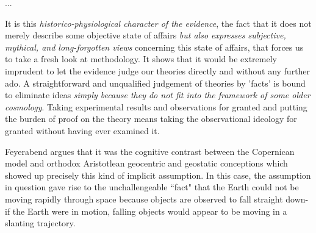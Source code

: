 \begin{longquote}
...

It is this \textit{historico-physiological character of the evidence}, the fact that it
does not merely describe some objective state of affairs \textit{but also
expresses subjective, mythical, and long-forgotten views} concerning this
state of affairs, that forces us to take a fresh look at methodology. It
shows that it would be extremely imprudent to let the evidence judge
our theories directly and without any further ado. A straightforward
and unqualified judgement of theories by 'facts' is bound to eliminate
ideas \textit{simply because they do not fit into the framework of some older
cosmology}. Taking experimental results and observations for granted
and putting the burden of proof on the theory means taking the
observational ideology for granted without having ever examined it.

\cite[p.52]{Feyerabend1993}
\end{longquote}

Feyerabend argues that it was the cognitive contrast between the Copernican model and orthodox Aristotlean geocentric and geostatic conceptions which showed up precisely this kind of implicit assumption. In this case, the assumption in question gave rise to the unchallengeable ``fact" that the Earth could not be moving rapidly through space because objects are observed to fall straight down- if the Earth were in motion, falling objects would appear to be moving in a slanting trajectory.

